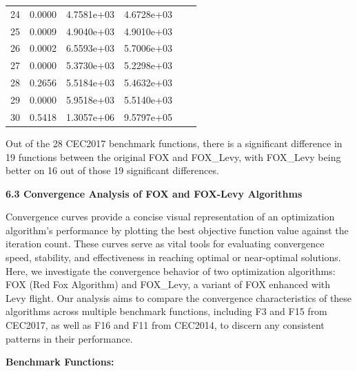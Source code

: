 \documentclass[
]{article}
\begin{document}
\begin{justify}
{\begin{table}[htbp]
\begin{tabular}{cccccc}
    24 & 0.0000 & 4.7581e+03 & 4.6728e+03 \\
    25 & 0.0009 & 4.9040e+03 & 4.9010e+03 \\
    26 & 0.0002 & 6.5593e+03 & 5.7006e+03 \\
    27 & 0.0000 & 5.3730e+03 & 5.2298e+03 \\
    28 & 0.2656 & 5.5184e+03 & 5.4632e+03 \\
    29 & 0.0000 & 5.9518e+03 & 5.5140e+03 \\
    30 & 0.5418 & 1.3057e+06 & 9.5797e+05\\
    \bottomrule
  \end{tabular}
\end{table}

Out of the 28 CEC2017 benchmark functions, there is a significant difference in 19 functions between the original FOX and FOX\_Levy, with FOX\_Levy being better on 16 out of those 19 significant differences.



\def\labelenumi{\arabic{enumi}.}
\item
\vspace{5mm}
\textbf{6.3 Convergence Analysis of FOX and FOX-Levy Algorithms}

Convergence curves provide a concise visual representation of an optimization algorithm's performance by plotting the best objective function value against the iteration count. These curves serve as vital tools for evaluating convergence speed, stability, and effectiveness in reaching optimal or near-optimal solutions. Here, we investigate the convergence behavior of two optimization algorithms: FOX (Red Fox Algorithm) and FOX\_Levy, a variant of FOX enhanced with Levy flight. Our analysis aims to compare the convergence characteristics of these algorithms across multiple benchmark functions, including F3 and F15 from CEC2017, as well as F16 and F11 from CEC2014, to discern any consistent patterns in their performance.

\textbf{Benchmark Functions:}

}
\end{justify}
\end{document}
